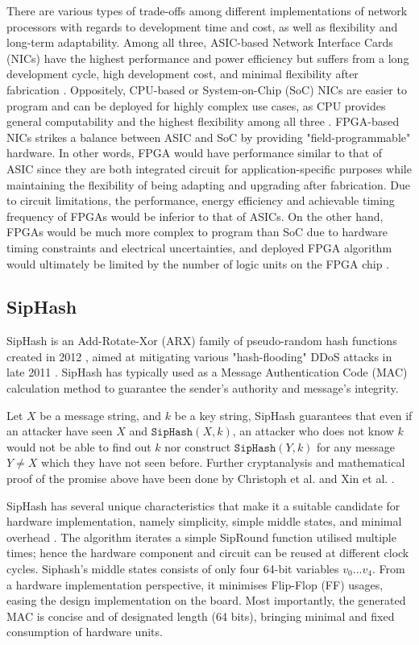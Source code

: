 \documentclass[a4paper]{report}
\newcommand{\code}{\texttt}
\begin{document}
There are various types of trade-offs among different implementations of network processors with regards to development time and cost, as well as flexibility and long-term adaptability. Among all three, ASIC-based Network Interface Cards (NICs) have the highest performance and power efficiency but suffers from a long development cycle, high development cost, and minimal flexibility after fabrication \cite{amara-2006, deierling-2018}. Oppositely, CPU-based or System-on-Chip (SoC) NICs are easier to program and can be deployed for highly complex use cases, as CPU provides general computability and the highest flexibility among all three \cite{deierling-2018}. FPGA-based NICs strikes a balance between ASIC and SoC by providing "field-programmable" hardware. In other words, FPGA would have performance similar to that of ASIC since they are both integrated circuit for application-specific purposes while maintaining the flexibility of being adapting and upgrading after fabrication. Due to circuit limitations, the performance, energy efficiency and achievable timing frequency of FPGAs would be inferior to that of ASICs. On the other hand, FPGAs would be much more complex to program than SoC due to hardware timing constraints and electrical uncertainties, and deployed FPGA algorithm would ultimately be limited by the number of logic units on the FPGA chip \cite{deierling-2018}.

\subsection{SipHash}

SipHash is an Add-Rotate-Xor (ARX) family of pseudo-random hash functions created in 2012 \cite{aumasson-bernstein-2012}, aimed at mitigating various "hash-flooding" DDoS attacks in late 2011 \cite{lennon-2011}. SipHash has typically used as a Message Authentication Code (MAC) calculation method to guarantee the sender's authority and message's integrity. 

Let $X$ be a message string, and $k$ be a key string, SipHash guarantees that even if an attacker have seen $X$ and $\code{SipHash}(X, k)$, an attacker who does not know $k$ would not be able to find out $k$ nor construct $\code{SipHash}(Y, k)$ for any message $Y \neq X$ which they have not seen before. Further cryptanalysis and mathematical proof of the promise above have been done by Christoph et al. \cite{dobraunig-2014} and Xin et al. \cite{xin-2019}.

SipHash has several unique characteristics that make it a suitable candidate for hardware implementation, namely simplicity, simple middle states, and minimal overhead \cite{aumasson-bernstein-2012}. The algorithm iterates a simple SipRound function utilised multiple times; hence the hardware component and circuit can be reused at different clock cycles. Siphash's middle states consists of only four 64-bit variables $v_0 ... v_4$. From a hardware implementation perspective, it minimises Flip-Flop (FF) usages, easing the design implementation on the board. Most importantly, the generated MAC is concise and of designated length (64 bits), bringing minimal and fixed consumption of hardware units.
\end{document}
